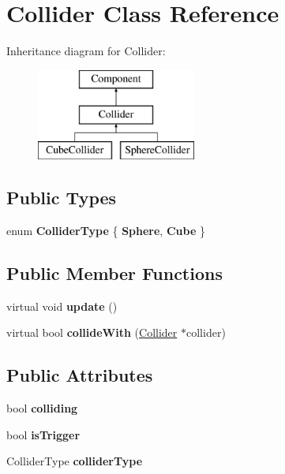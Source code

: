 \hypertarget{class_collider}{\section{Collider Class Reference}
\label{class_collider}
}
Inheritance diagram for Collider\-:\begin{figure}[H]
\begin{center}
\leavevmode
\includegraphics[height=3.000000cm]{class_collider}
\end{center}
\end{figure}
\subsection*{Public Types}
\begin{DoxyCompactItemize}
\item 
enum {\bfseries Collider\-Type} \{ {\bfseries Sphere}, 
{\bfseries Cube}
 \}
\end{DoxyCompactItemize}
\subsection*{Public Member Functions}
\begin{DoxyCompactItemize}
\item 
\hypertarget{class_collider_a9b3f8c0fe7f759f4b49c6004145f38e1}{virtual void {\bfseries update} ()}\label{class_collider_a9b3f8c0fe7f759f4b49c6004145f38e1}

\item 
\hypertarget{class_collider_af6c772784bf93c27e306dbcefcbe6723}{virtual bool {\bfseries collide\-With} (\hyperlink{class_collider}{Collider} $\ast$collider)}\label{class_collider_af6c772784bf93c27e306dbcefcbe6723}

\end{DoxyCompactItemize}
\subsection*{Public Attributes}
\begin{DoxyCompactItemize}
\item 
\hypertarget{class_collider_ae5d1fa87fdedd0e892af496e2ef1003e}{bool {\bfseries colliding}}\label{class_collider_ae5d1fa87fdedd0e892af496e2ef1003e}

\item 
\hypertarget{class_collider_a3068bd0bbdb66fc93a3ef3063ac556fa}{bool {\bfseries is\-Trigger}}\label{class_collider_a3068bd0bbdb66fc93a3ef3063ac556fa}

\item 
\hypertarget{class_collider_a9a7dcf95e0a0cf31f08ceaba945c75e5}{Collider\-Type {\bfseries collider\-Type}}\label{class_collider_a9a7dcf95e0a0cf31f08ceaba945c75e5}

\end{DoxyCompactItemize}
